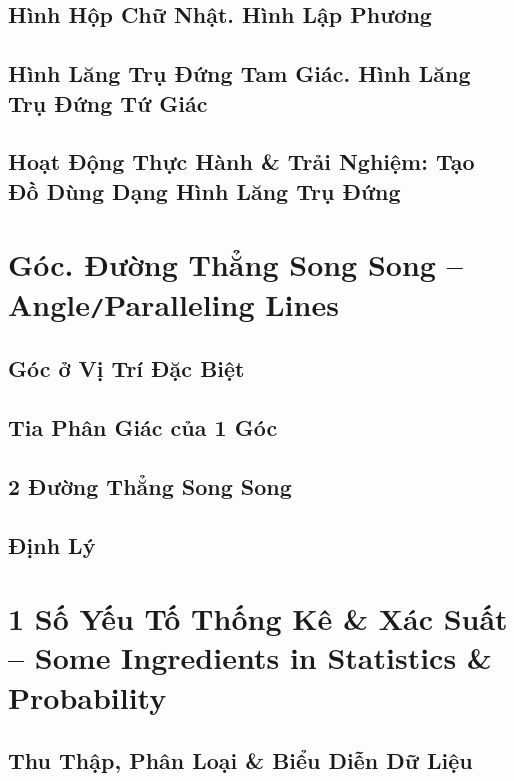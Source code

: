 \documentclass[oneside]{book}
\numberwithin{equation}{section}
\begin{document}
\section{Hình Hộp Chữ Nhật. Hình Lập Phương}

\section{Hình Lăng Trụ Đứng Tam Giác. Hình Lăng Trụ Đứng Tứ Giác}

\section{Hoạt Động Thực Hành \& Trải Nghiệm: Tạo Đồ Dùng Dạng Hình Lăng Trụ Đứng}


\chapter{Góc. Đường Thẳng Song Song -- Angle\texttt{/}Paralleling Lines}

\section{Góc ở Vị Trí Đặc Biệt}

\section{Tia Phân Giác của 1 Góc}

\section{2 Đường Thẳng Song Song}

\section{Định Lý}


\chapter{1 Số Yếu Tố Thống Kê \& Xác Suất -- Some Ingredients in Statistics \& Probability}

\section{Thu Thập, Phân Loại \& Biểu Diễn Dữ Liệu}
\end{document}
